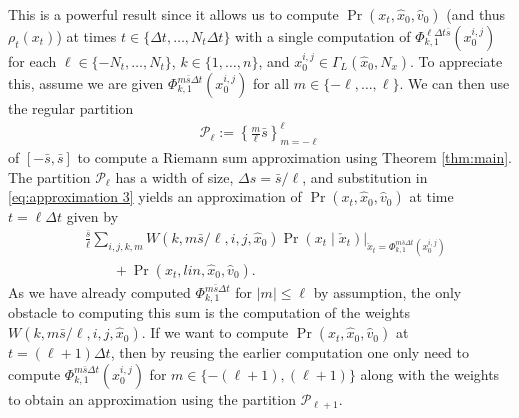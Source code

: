 \documentclass[letterpaper,10pt,conference]{ieeeconf}
\begin{document}
This is a powerful result since it allows us to compute $\Pr( x_t, \hat{x}_0, \hat{v}_0)$  (and thus $\rho_t(x_t)$) at times $t \in \{\Delta t, \dots, N_t \Delta t\}$ with a single computation of $\Phi_{k,1}^{\ell \Delta t \bar{s}}( x_0^{i,j})$ for each $\ell \in  \{-N_t,\dots,N_t\}$, $k \in \{1,\dots,n\}$, and $x_0^{i,j} \in \Gamma_L( \hat{x}_0 , N_x)$.
To appreciate this, assume we are given $\Phi_{k,1}^{m  \bar{s} \Delta t}(x_0^{i,j})$ for all $m \in \{ -\ell, \ldots, \ell \}$.
We can then use the regular partition
\begin{align}
	\mathcal{P}_\ell := \left\{ \frac{m}{\ell} \bar{s} \right\}_{m=-\ell}^{\ell} \label{eq:partition}
\end{align}
of $[-\bar{s}, \bar{s}]$ to compute a Riemann sum approximation using Theorem \ref{thm:main}.
The partition $\mathcal{P}_\ell$ has a width of size, $\Delta s = \bar{s} / \ell$, and substitution in \eqref{eq:approximation 3} yields an approximation of $\Pr( x_t, \hat{x}_0, \hat{v}_0)$ at time $t=\ell \Delta t$
given by
\begin{align}
		&\frac{\bar{s}}{\ell} \sum_{i,j,k,m} W(k,m \bar{s} / \ell ,i,j,\hat{x}_0) \left. \Pr( x_t \mid \check{x}_t ) \right|_{ \check{x}_t = \Phi_{k,1}^{m \bar{s} \Delta t}( x_0^{i,j}) }  \nonumber \\
		&\qquad+\Pr( x_t , lin, \hat{x}_0, \hat{v}_0 ).
\end{align}
As we have already computed $\Phi_{k,1}^{m \bar{s} \Delta t}$ for $| m | \leq \ell$ by assumption, the only obstacle to computing this sum is the computation of the weights $W(k,m \bar{s} / \ell ,i,j,\hat{x}_0)$.
If we want to compute $\Pr( x_t, \hat{x}_0, \hat{v}_0)$ at $t=(\ell + 1 ) \Delta t$, then by reusing the earlier computation one only need to compute $\Phi_{k,1}^{m  \bar{s} \Delta t}(x_0^{i,j})$ for $m \in \{ -( \ell + 1 ), (\ell + 1 )\}$ along with the weights to obtain an approximation using the partition $\mathcal{P}_{\ell + 1}$.


\end{document}
